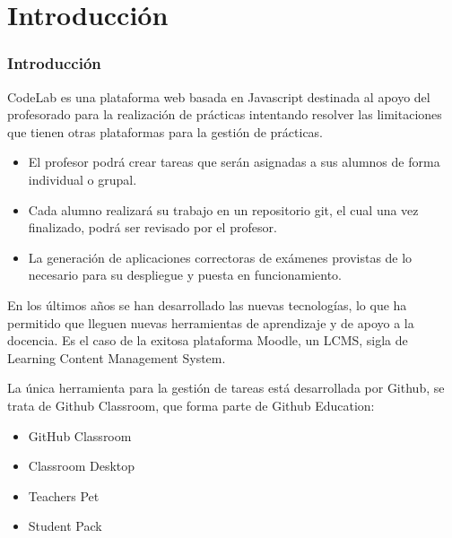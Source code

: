 \documentclass{beamer}
\begin{document}
\section{Introducción}
\begin{frame}
  \frametitle{Introducción}
  
  \begin{center}
    CodeLab es una plataforma web basada en Javascript destinada al apoyo del profesorado para la realización de prácticas 
    intentando resolver las limitaciones que tienen otras plataformas para la gestión de prácticas.
  \end{center}
  \framebreak
  
  \begin{itemize}
    \item El profesor podrá crear tareas que serán asignadas a sus alumnos de forma individual o grupal. 
    \item Cada alumno realizará su trabajo en un repositorio git, el cual una vez finalizado, podrá ser revisado por el profesor.
    \item La generación de aplicaciones correctoras de exámenes provistas de lo necesario para su despliegue y puesta en funcionamiento.
  \end{itemize}

  \framebreak
  
  En los últimos años se han desarrollado las nuevas tecnologías, lo que ha permitido que lleguen 
  nuevas herramientas de aprendizaje y de apoyo a la docencia. Es el caso de la exitosa plataforma 
  Moodle, un LCMS, sigla de Learning Content Management System.
  
  \framebreak
  
  La única herramienta para la gestión de tareas está desarrollada por Github, se trata de Github Classroom, 
  que forma parte de Github Education:
  
  \begin{itemize}
    \item GitHub Classroom
    \item Classroom Desktop
    \item Teachers Pet
    \item Student Pack
  \end{itemize}


\end{frame}
\end{document}
